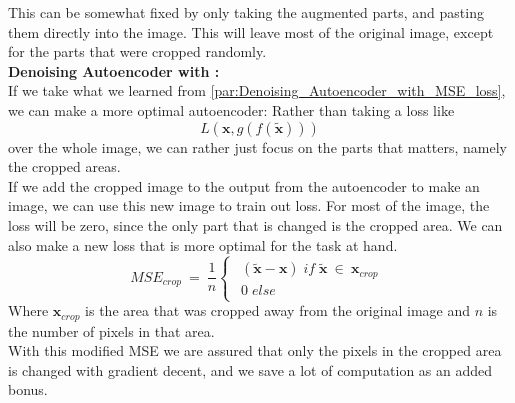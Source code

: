     This can be somewhat fixed by only taking the augmented parts, and pasting them directly into the image. This will leave most of the original image, except for the parts that were cropped randomly.\\
    
    \vspace{10px}
    \textbf{Denoising Autoencoder with :}\\
    If we take what we learned from \ref{par:Denoising_Autoencoder_with_MSE_loss}, we can make a more optimal autoencoder:
    Rather than taking a loss like     
    \begin{equation}
      L(\textbf{x},g(f(\widetilde{\textbf{x}})))
    \end{equation}
    over the whole image, we can rather just focus on the parts that matters, namely the cropped areas.\\
    
    If we add the cropped image to the output from the autoencoder to make an image, we can use this new image to train out loss.
    For most of the image, the loss will be zero, since the only part that is changed is the cropped area. 
    We can also make a new loss that is more optimal for the task at hand. 
    \begin{equation}
      MSE_{crop}\:=\: \frac{1}{n}
      \begin{cases}
          \begin{array}{lcl}
          (\widetilde{\textbf{x}}-\textbf{x}) \; if \; \widetilde{\textbf{x}} \: \in \: \textbf{x}_{crop} \\
          0 \; else
          \end{array}
      \end{cases}
    \end{equation}
    Where $\textbf{x}_{crop}$ is the area that was cropped away from the original image and $n$ is the number of pixels in that area.\\
    With this modified MSE we are assured that only the pixels in the cropped area is changed with gradient decent, and we save a lot of computation as an added bonus.
    
